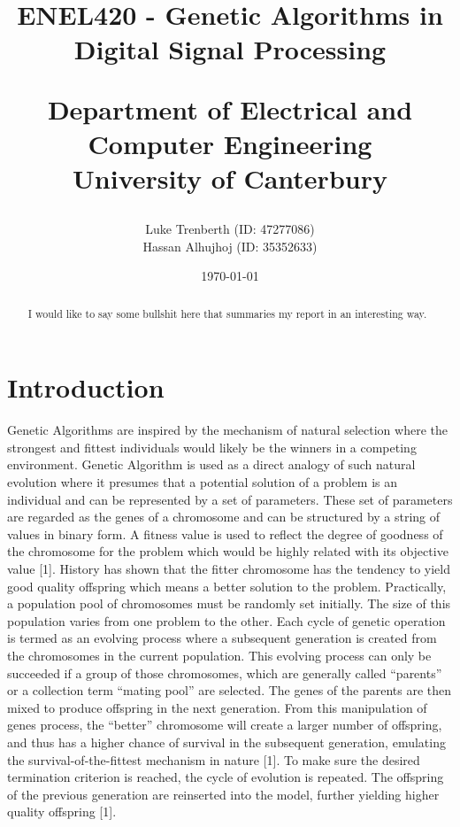 \documentclass[a4paper, 11pt]{article}
\title{
    ENEL420 - Genetic Algorithms in Digital Signal Processing\\
    \vspace{1cm}
    \begin{large} 
        Department of Electrical and Computer Engineering\\
        University of Canterbury\\
    \end{large}
    \vspace{1cm}
}
\author{
    \small {Luke Trenberth (ID: 47277086)}\\
    \small {Hassan Alhujhoj (ID: 35352633)}\\
    }
\date{\small\today}
\begin{document}
\maketitle

\begin{abstract}
    I would like to say some bullshit here that summaries my report in an interesting way.
\end{abstract}

\pagebreak
{}
\tableofcontents
{}
\pagebreak

\section{Introduction}\label{sec:intro}
Genetic Algorithms are inspired by the mechanism of natural selection where the strongest and fittest 
individuals would likely be the winners in a competing environment. Genetic Algorithm is used as a direct 
analogy of such natural evolution where it presumes that a potential solution of a problem is an individual 
and can be represented by a set of parameters. These set of parameters are regarded as the genes of a chromosome 
and can be structured by a string of values in binary form. A fitness value is used to reflect the degree of 
goodness of the chromosome for the problem which would be highly related with its objective value [1].
History has shown that the fitter chromosome has the tendency to yield good quality offspring which means a 
better solution to the problem. Practically, a population pool of chromosomes must be randomly set initially. The size of this population varies from one problem to the other. Each cycle of genetic operation is termed as an evolving process where a subsequent generation is created from the chromosomes in the current population.  This evolving process can only be succeeded if a group of those chromosomes, which are generally called “parents” or a collection term “mating pool” are selected. The genes of the parents are then mixed to produce offspring in the next generation. From this manipulation of genes process, the “better” chromosome will create a larger number of offspring, and thus has a higher chance of survival in the subsequent generation, emulating the survival-of-the-fittest mechanism in nature [1].
To make sure the desired termination criterion is reached, the cycle of evolution is repeated. The offspring of the previous generation are reinserted into the model, further yielding higher quality offspring [1]. 
\end{document}
